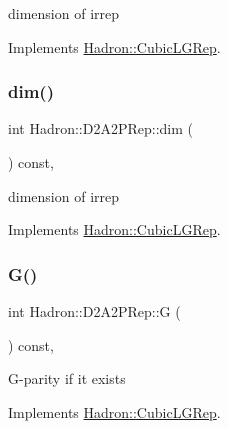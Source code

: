 dimension of irrep 

Implements \mbox{\hyperlink{structHadron_1_1CubicLGRep_a3acbaea26503ed64f20df693a48e4cdd}{Hadron\+::\+Cubic\+L\+G\+Rep}}.

\mbox{\label{structHadron_1_1D2A2PRep_a1b4aaa7427dc7ee8255807a8cfa19e61}} 
\subsubsection{\texorpdfstring{dim()}{dim()}\hspace{0.1cm}{\footnotesize\ttfamily [2/2]}}
{\footnotesize\ttfamily int Hadron\+::\+D2\+A2\+P\+Rep\+::dim (\begin{DoxyParamCaption}{ }\end{DoxyParamCaption}) const\hspace{0.3cm}{\ttfamily [inline]}, {\ttfamily [virtual]}}

dimension of irrep 

Implements \mbox{\hyperlink{structHadron_1_1CubicLGRep_a3acbaea26503ed64f20df693a48e4cdd}{Hadron\+::\+Cubic\+L\+G\+Rep}}.

\mbox{\label{structHadron_1_1D2A2PRep_aa0b832a72029fb46f658a4e726cd5cfb}} 
\subsubsection{\texorpdfstring{G()}{G()}\hspace{0.1cm}{\footnotesize\ttfamily [1/2]}}
{\footnotesize\ttfamily int Hadron\+::\+D2\+A2\+P\+Rep\+::G (\begin{DoxyParamCaption}{ }\end{DoxyParamCaption}) const\hspace{0.3cm}{\ttfamily [inline]}, {\ttfamily [virtual]}}

G-\/parity if it exists 

Implements \mbox{\hyperlink{structHadron_1_1CubicLGRep_ace26f7b2d55e3a668a14cb9026da5231}{Hadron\+::\+Cubic\+L\+G\+Rep}}.

\mbox{\label{structHadron_1_1D2A2PRep_aa0b832a72029fb46f658a4e726cd5cfb}} 
